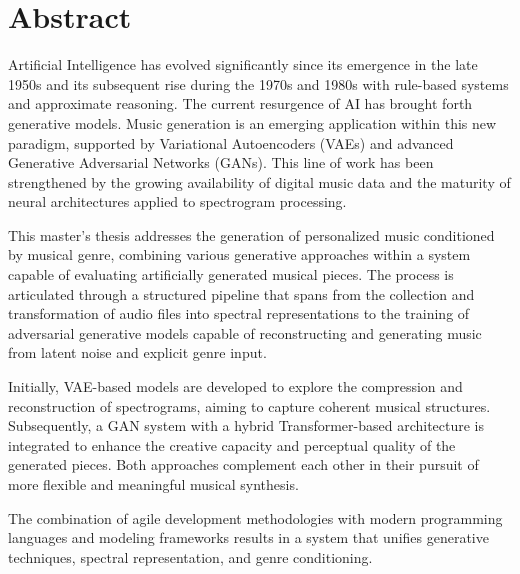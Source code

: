 \cleardoublepage

\chapter*{Abstract}
\label{resumen}

Artificial Intelligence has evolved significantly since its emergence in the late 1950s and its subsequent rise during the 1970s and 1980s with rule-based systems and approximate reasoning. The current resurgence of AI has brought forth generative models. Music generation is an emerging application within this new paradigm, supported by Variational Autoencoders (VAEs) and advanced Generative Adversarial Networks (GANs). This line of work has been strengthened by the growing availability of digital music data and the maturity of neural architectures applied to spectrogram processing.
    
This master's thesis addresses the generation of personalized music conditioned by musical genre, combining various generative approaches within a system capable of evaluating artificially generated musical pieces. The process is articulated through a structured pipeline that spans from the collection and transformation of audio files into spectral representations to the training of adversarial generative models capable of reconstructing and generating music from latent noise and explicit genre input.

Initially, VAE-based models are developed to explore the compression and reconstruction of spectrograms, aiming to capture coherent musical structures. Subsequently, a GAN system with a hybrid Transformer-based architecture is integrated to enhance the creative capacity and perceptual quality of the generated pieces. Both approaches complement each other in their pursuit of more flexible and meaningful musical synthesis.

The combination of agile development methodologies with modern programming languages and modeling frameworks results in a system that unifies generative techniques, spectral representation, and genre conditioning.
